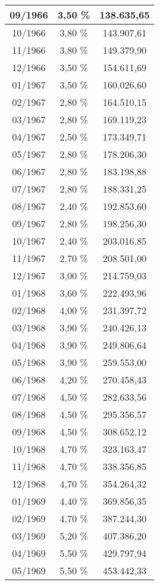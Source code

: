 \begin{center}
\begin{longtable}{|c|c|c|}
09/1966 & 3,50 \% & 138.635,65 \\ \hline
10/1966 & 3,80 \% & 143.907,61 \\ \hline
11/1966 & 3,80 \% & 149.379,90 \\ \hline
12/1966 & 3,50 \% & 154.611,69 \\ \hline
01/1967 & 3,50 \% & 160.026,60 \\ \hline
02/1967 & 2,80 \% & 164.510,15 \\ \hline
03/1967 & 2,80 \% & 169.119,23 \\ \hline
04/1967 & 2,50 \% & 173.349,71 \\ \hline
05/1967 & 2,80 \% & 178.206,30 \\ \hline
06/1967 & 2,80 \% & 183.198,88 \\ \hline
07/1967 & 2,80 \% & 188.331,25 \\ \hline
08/1967 & 2,40 \% & 192.853,60 \\ \hline
09/1967 & 2,80 \% & 198.256,30 \\ \hline
10/1967 & 2,40 \% & 203.016,85 \\ \hline
11/1967 & 2,70 \% & 208.501,00 \\ \hline
12/1967 & 3,00 \% & 214.759,03 \\ \hline
01/1968 & 3,60 \% & 222.493,96 \\ \hline
02/1968 & 4,00 \% & 231.397,72 \\ \hline
03/1968 & 3,90 \% & 240.426,13 \\ \hline
04/1968 & 3,90 \% & 249.806,64 \\ \hline
05/1968 & 3,90 \% & 259.553,00 \\ \hline
06/1968 & 4,20 \% & 270.458,43 \\ \hline
07/1968 & 4,50 \% & 282.633,56 \\ \hline
08/1968 & 4,50 \% & 295.356,57 \\ \hline
09/1968 & 4,50 \% & 308.652,12 \\ \hline
10/1968 & 4,70 \% & 323.163,47 \\ \hline
11/1968 & 4,70 \% & 338.356,85 \\ \hline
12/1968 & 4,70 \% & 354.264,32 \\ \hline
01/1969 & 4,40 \% & 369.856,35 \\ \hline
02/1969 & 4,70 \% & 387.244,30 \\ \hline
03/1969 & 5,20 \% & 407.386,20 \\ \hline
04/1969 & 5,50 \% & 429.797,94 \\ \hline
05/1969 & 5,50 \% & 453.442,33 \\ \hline

\end{longtable}
\end{center}
